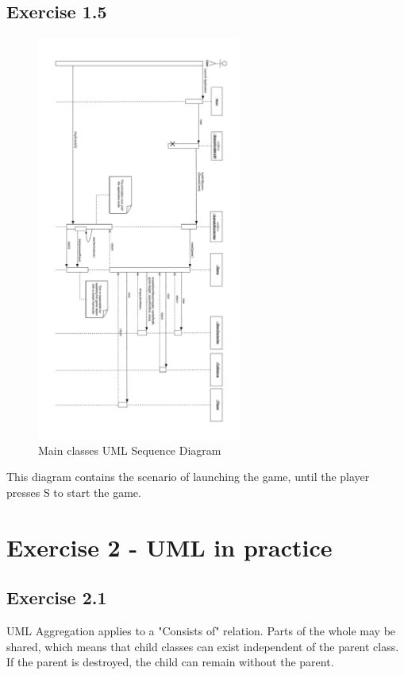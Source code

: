 \documentclass[10pt]{article}
\begin{document}
 \subsection*{Exercise 1.5} 
\begin{figure}[ht!]
\centering
\includegraphics[width=0.6\textwidth]{SI-Sequence.pdf}
\caption{Main classes UML Sequence Diagram}
\end{figure}
This diagram contains the scenario of launching the game, until the player presses S to start the game.
\pagebreak

\section{Exercise 2 - UML in practice}
\subsection*{Exercise 2.1}
UML Aggregation applies to a "Consists of" relation.
Parts of the whole may be shared, which means that child classes can exist independent of the parent class.
If the parent is destroyed, the child can remain without the parent.
\end{document}
